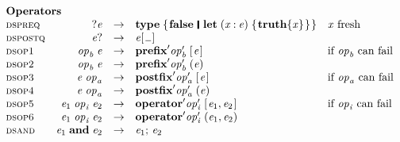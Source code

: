 \begin{figure}
$$
\begin{array}{lrcll}
  \multicolumn{5}{l}{\textbf{Operators}} \\
\rulename{dspreq} &  \ensuremath{\mathbin{?}\Varid{e}}     & \rightarrow & \ensuremath{\textbf{type}\;\{\mskip1.5mu \textbf{false}\hspace{0.19em}\mathop{\rule[-0.1em]{0.15em}{0.75em}}\hspace{0.2em}\mathbf{let}\;(\Varid{x}\mathbin{:}\Varid{e})\;\{\mskip1.5mu \textbf{truth}\{\Varid{x}\}\mskip1.5mu\}\mskip1.5mu\}} & \text{\ensuremath{\Varid{x}} fresh} \\
\rulename{dspostq} & \ensuremath{\Varid{e}\mathbin{?}}     & \rightarrow & \ensuremath{\Varid{e} [\mskip1.5mu \anonymous \mskip1.5mu]} \\
\rulename{dsop1} &   \ensuremath{\Varid{op}_{\Varid{b}}\;\Varid{e}} & \rightarrow & \ensuremath{\textbf{prefix}\textquote \Varid{op}_{\Varid{b}}\textquote\;[\mskip1.5mu \Varid{e}\mskip1.5mu]} & \text{if \ensuremath{\Varid{op}_{\Varid{b}}} can fail}\\
\rulename{dsop2} &   \ensuremath{\Varid{op}_{\Varid{b}}\;\Varid{e}} & \rightarrow & \ensuremath{\textbf{prefix}\textquote \Varid{op}_{\Varid{b}}\textquote\;(\Varid{e})} \\
\rulename{dsop3} &   \ensuremath{\Varid{e}\;\Varid{op}_{\Varid{a}}} & \rightarrow & \ensuremath{\textbf{postfix}\textquote \Varid{op}_{\Varid{a}}\textquote\;[\mskip1.5mu \Varid{e}\mskip1.5mu]} & \text{if \ensuremath{\Varid{op}_{\Varid{a}}} can fail}\\
\rulename{dsop4} &   \ensuremath{\Varid{e}\;\Varid{op}_{\Varid{a}}} & \rightarrow & \ensuremath{\textbf{postfix}\textquote \Varid{op}_{\Varid{a}}\textquote\;(\Varid{e})} \\
\rulename{dsop5} &   \ensuremath{\Varid{e}_{\mathrm{1}}\;\Varid{op}_{\Varid{i}}\;\Varid{e}_{\mathrm{2}}} & \rightarrow & \ensuremath{\textbf{operator}\textquote \Varid{op}_{\Varid{i}}\textquote\;[\mskip1.5mu \Varid{e}_{\mathrm{1}},\Varid{e}_{\mathrm{2}}\mskip1.5mu]} & \text{if \ensuremath{\Varid{op}_{\Varid{i}}} can fail}\\
\rulename{dsop6} &   \ensuremath{\Varid{e}_{\mathrm{1}}\;\Varid{op}_{\Varid{i}}\;\Varid{e}_{\mathrm{2}}} & \rightarrow & \ensuremath{\textbf{operator}\textquote \Varid{op}_{\Varid{i}}\textquote\;(\Varid{e}_{\mathrm{1}},\Varid{e}_{\mathrm{2}})} \\
\rulename{dsand} &   \ensuremath{\Varid{e}_{\mathrm{1}}\;\textbf{and}\;\Varid{e}_{\mathrm{2}}} & \rightarrow & \ensuremath{\Varid{e}_{\mathrm{1}};\,\Varid{e}_{\mathrm{2}}} \\

\end{array}$$
\end{figure}
